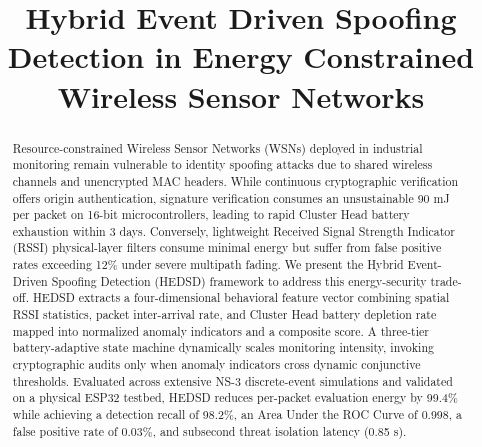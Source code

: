 \documentclass[conference]{IEEEtran}
\begin{document}
\title{Hybrid Event Driven Spoofing Detection in Energy Constrained Wireless Sensor Networks}

\author{
\and
{}
}

\maketitle

\begin{abstract}
Resource-constrained Wireless Sensor Networks (WSNs) deployed in industrial monitoring remain vulnerable to identity spoofing attacks due to shared wireless channels and unencrypted MAC headers. While continuous cryptographic verification offers origin authentication, signature verification consumes an unsustainable 90 mJ per packet on 16-bit microcontrollers, leading to rapid Cluster Head battery exhaustion within 3 days. Conversely, lightweight Received Signal Strength Indicator (RSSI) physical-layer filters consume minimal energy but suffer from false positive rates exceeding 12\% under severe multipath fading. We present the Hybrid Event-Driven Spoofing Detection (HEDSD) framework to address this energy-security trade-off. HEDSD extracts a four-dimensional behavioral feature vector combining spatial RSSI statistics, packet inter-arrival rate, and Cluster Head battery depletion rate mapped into normalized anomaly indicators and a composite score. A three-tier battery-adaptive state machine dynamically scales monitoring intensity, invoking cryptographic audits only when anomaly indicators cross dynamic conjunctive thresholds. Evaluated across extensive NS-3 discrete-event simulations and validated on a physical ESP32 testbed, HEDSD reduces per-packet evaluation energy by 99.4\% while achieving a detection recall of 98.2\%, an Area Under the ROC Curve of 0.998, a false positive rate of 0.03\%, and subsecond threat isolation latency (0.85 s).
\end{abstract}
\end{document}
